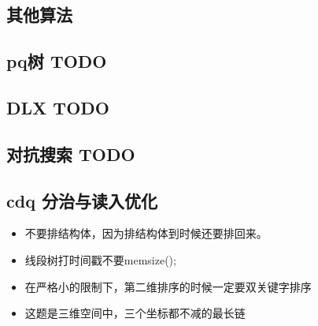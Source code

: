\documentclass[landscape]{report}
\newcommand{\includecode}[2][c]{}
\begin{document}
\begin{flushleft}
\begin{multicols}{2}
\chapter{ 其他算法}
\section{pq树 TODO}
\section{ DLX TODO}
\section{ 对抗搜索 TODO}
\section{ cdq 分治与读入优化}
\begin{itemize}

\item 不要排结构体，因为排结构体到时候还要排回来。
\item 线段树打时间戳不要memsize();
\item 在严格小的限制下，第二维排序的时候一定要双关键字排序
\item 这题是三维空间中，三个坐标都不减的最长链

\end{itemize}
\includecode[c++]{hdu4742.cpp}
\end{multicols}
\end{flushleft}
\end{document}
